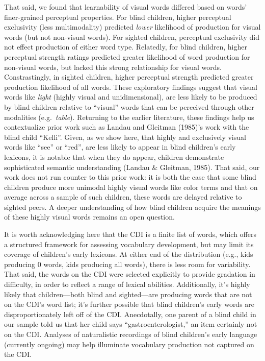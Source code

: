 \documentclass[
  man,floatsintext]{apa6}
\begin{document}
That said, we found that learnability of visual words differed based on words' finer-grained perceptual properties. For blind children, higher perceptual exclusivity (less multimodality) predicted \emph{lower} likelihood of production for visual words (but not non-visual words). For sighted children, perceptual exclusivity did not effect production of either word type. Relatedly, for blind children, higher perceptual strength ratings predicted greater likelihood of word production for non-visual words, but lacked this strong relationship for visual words. Constrastingly, in sighted children, higher perceptual strength predicted greater production likelihood of all words. These exploratory findings suggest that visual words like \emph{light} (highly visual and unidimensional), are less likely to be produced by blind children relative to ``visual'' words that can be perceived through other modalities (e.g.~\emph{table}). Returning to the earlier literature, these findings help us contextualize prior work such as Landau and Gleitman (1985)'s work with the blind child ``Kelli''. Given, as we show here, that highly and exclusively visual words like ``see'' or ``red'', are less likely to appear in blind children's early lexicons, it is notable that when they do appear, children demonstrate sophisticated semantic understanding (Landau \& Gleitman, 1985). That said, our work does not run counter to this prior work: it is both the case that some blind children produce more unimodal highly visual words like color terms and that on average across a sample of such children, these words are delayed relative to sighted peers. A deeper understanding of how blind children acquire the meanings of these highly visual words remains an open question.

It is worth acknowledging here that the CDI is a finite list of words, which offers a structured framework for assessing vocabulary development, but may limit its coverage of children's early lexicons. At either end of the distribution (e.g., kids producing 0 words, kids producing all words), there is less room for variability. That said, the words on the CDI were selected explicitly to provide gradation in difficulty, in order to reflect a range of lexical abilities. Additionally, it's highly likely that children---both blind and sighted---are producing words that are not on the CDI's word list; it's further possible that blind children's early words are disproportionately left off of the CDI. Anecdotally, one parent of a blind child in our sample told us that her child says ``gastroenterologist,'' an item certainly not on the CDI. Analyses of naturalistic recordings of blind children's early language (currently ongoing) may help illuminate vocabulary production not captured on the CDI.
\end{document}
